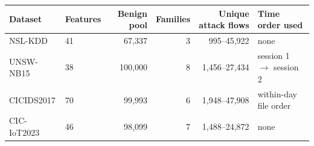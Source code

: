 \begin{tabular}{llrrrl}
\toprule
Dataset & Features & Benign pool & Families & Unique attack flows & Time order used \\
\midrule
NSL-KDD & 41 & 67,337 & 3 & 995--45,922 & none \\
UNSW-NB15 & 38 & 100,000 & 8 & 1,456--27,434 & session 1 $\to$ session 2 \\
CICIDS2017 & 70 & 99,993 & 6 & 1,948--47,908 & within-day file order \\
CIC-IoT2023 & 46 & 98,099 & 7 & 1,488--24,872 & none \\
\bottomrule
\end{tabular}
